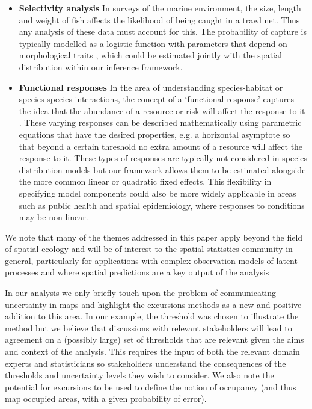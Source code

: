 \documentclass[preprint,12pt]{elsarticle}
\begin{document}
\begin{itemize}
	\item \textbf{Selectivity analysis} In surveys of the marine environment, the size, length and weight of fish affects the likelihood of being caught in a trawl net.  Thus any analysis of these data must account for this.  The probability of capture is typically modelled as a logistic function with parameters that depend on morphological traits \citep{herrmann_understanding_2016, madsen_selectivity_2007, galbraith_demersal_1994}, which could be estimated jointly with the spatial distribution within our inference framework.  
	\item \textbf{Functional responses} In the area of understanding species-habitat or species-species interactions, the concept of a `functional response' captures the idea that the abundance of a resource or risk will affect the response to it \citep{holling_some_1959}.  These varying responses can be described mathematically using parametric equations that have the desired properties, e.g. a horizontal asymptote so that beyond a certain threshold no extra amount of a resource will affect the response to it.  These types of responses are typically not considered in species distribution models but our framework allows them to be estimated alongside the more common linear or quadratic fixed effects. This flexibility in specifying model components could also be more widely applicable in areas such as public health and spatial epidemiology, where responses to conditions may be non-linear.  
	
\end{itemize}
We note that many of the themes addressed in this paper apply beyond the field of spatial ecology and will be of interest to the spatial statistics community in general, particularly for applications with complex observation models of latent processes and where spatial predictions are a key output of the analysis

In our analysis we only briefly touch upon the problem of communicating uncertainty in maps and highlight the excursions methods as a new and positive addition to this area.  In our example, the threshold was chosen to illustrate the method but we believe that discussions with relevant stakeholders will lead to agreement on a (possibly large) set of thresholds that are relevant given the aims and context of the analysis.  This requires the input of both the relevant domain experts and statisticians so stakeholders understand the consequences of the thresholds and uncertainty levels they wish to consider.  We also note the potential for excursions to be used to define the notion of occupancy (and thus map occupied areas, with a given probability of error).   
\end{document}
